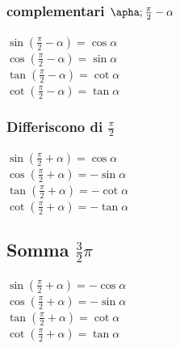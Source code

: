 \documentclass{report}
\begin{document}
\subsubsection{complementari $\apha;\frac{\pi}{2}-\alpha$} %
\label{sec:complementari}
$\sin(\frac{\pi}{2}-\alpha) = \cos\alpha$ 
\\
$\cos(\frac{\pi}{2}-\alpha) = \sin\alpha$ 
\\ 
$\tan(\frac{\pi}{2}-\alpha) = \cot\alpha$ 
\\
$\cot(\frac{\pi}{2}-\alpha) = \tan\alpha$
\subsubsection{Differiscono di $\frac{\pi}{2}$} %
\label{sec:Differiscono di $\frac{\pi}{2}$}
$\sin(\frac{\pi}{2}+\alpha) = \cos\alpha$ 
\\
$\cos(\frac{\pi}{2}+\alpha) = -\sin\alpha$ 
\\ 
$\tan(\frac{\pi}{2}+\alpha) = -\cot\alpha$ 
\\
$\cot(\frac{\pi}{2}+\alpha) = -\tan\alpha$ 
\subsection{Somma $\frac{3}{2}\pi$} %
\label{sub:Somma $\frac{3}{2}\pi$}
$\sin(\frac{\pi}{2}+\alpha) = -\cos\alpha$ 
\\
$\cos(\frac{\pi}{2}+\alpha) = -\sin\alpha$ 
\\ 
$\tan(\frac{\pi}{2}+\alpha) = \cot\alpha$ 
\\
$\cot(\frac{\pi}{2}+\alpha) = \tan\alpha$ 
\end{document}
